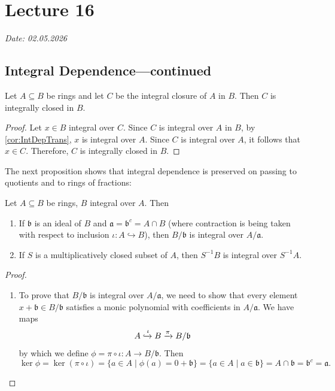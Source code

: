 \chapter{Lecture 16}
\hfill {\footnotesize \emph{Date: 02.05.2026}}
\section{Integral Dependence---continued}
\begin{corollary}
  Let \( A \subseteq B \) be rings and let \( C \) be the integral closure of  \( A \) in  \( B \). Then  \( C \) is integrally closed in  \( B \).
\end{corollary}
\begin{proof}
  Let \( x \in B \) integral over  \( C \). Since  \( C \) is integral over  \( A \) in  \( B \), by \autoref{cor:IntDepTrans}, \( x \) is integral over  \( A \). Since  \( C \) is integral over  \( A \), it follows that  \( x \in C \). Therefore,  \( C \) is integrally closed in \( B \).
\end{proof}
The next proposition shows that integral dependence is preserved on passing to quotients and to rings of fractions:
\begin{proposition}\label{prop:preservationOfIntegralDependenceUnderQuotientAndFractions}
  Let \( A \subseteq B \) be rings, \( B \) integral over  \( A \). Then
  \begin{enumerate}[label=\roman*)]
    \item If \( \mathfrak{b} \) is an ideal of \( B \) and  \( \mathfrak{a} = \mathfrak{b}^c = A \cap B\) (where contraction is being taken with respect to inclusion \( \iota : A \hookrightarrow B \)), then \( B / \mathfrak{b} \) is integral over \( A / \mathfrak{a} \).
    \item  If \( S \) is a multiplicatively closed subset of  \( A \), then  \( S^{-1} B \) is integral over  \( S^{-1} A \).
  \end{enumerate}
\end{proposition}
\begin{proof}
  \begin{enumerate}[label=\roman*)]
    \item To prove that \( B / \mathfrak{b} \) is integral over \( A / \mathfrak{a} \), we need to show that every element \( x + \mathfrak{b} \in B / \mathfrak{b}\) satisfies a monic polynomial with coefficients in \( A / \mathfrak{a} \). We have maps
      \[
        A \xhookrightarrow{\iota} B \xrightarrow{\pi} B / \mathfrak{b}
      \]
      by which we define \( \phi = \pi \circ \iota : A \to B / \mathfrak{b} \). Then
      \[
      \ker \phi = \ker(\pi \circ \iota) = \{a \in A \mid \phi(a) = 0 + \mathfrak{b}\} = \{a \in A \mid a \in \mathfrak{b}\} = A \cap \mathfrak{b} = \mathfrak{b}^c = \mathfrak{a}.
      \]
  \end{enumerate}
\end{proof}
